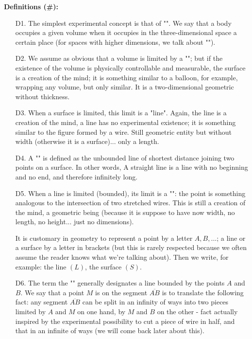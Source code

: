 	\textbf{Definitions (\#\mydef):}
	\begin{enumerate}
		\item[D1.] The simplest experimental concept is that of "". We say that a body occupies a given volume when it occupies in the three-dimensional space a certain place (for spaces with higher dimensions, we talk about "").
		
		\item[D2.] We assume as obvious that a volume is limited by a ""; but if the existence of the volume is physically controllable and measurable, the surface is a creation of the mind; it is something similar to a balloon, for example, wrapping any volume, but only similar. It is a two-dimensional geometric without thickness.
		
		\item[D3.] When a surface is limited, this limit is a "line". Again, the line is a creation of the mind, a line has no experimental existence; it is something similar to the figure formed by a wire. Still geometric entity but without width (otherwise it is a surface)... only a length.
		
		\item[D4.] A "" is defined as the unbounded line of shortest distance joining two points on a surface. In other words, A straight line is a line with no beginning and no end, and therefore infinitely long.
		
		\item[D5.] When a line is limited (bounded), its limit is a "": the point is something analogous to the intersection of two stretched wires. This is still a creation of the mind, a geometric being (because it is suppose to have now width, no length, no height... just no dimensions).


	\begin{tcolorbox}[title=Remark,colframe=black,arc=10pt]
It is customary in geometry to represent a point by a letter $A, B, ...$; a line or a surface by a letter in brackets (but this is rarely respected because we often assume the reader knows what we're talking about). Then we write, for example: the line $(L)$, the surface $(S)$.
	\end{tcolorbox}		
		
		\item[D6.] The term the "" generally designates a line bounded by the points $A$ and $B$. We say that a point $M$ is on the segment $\overline{AB}$ is to translate the following fact: any segment $\overline{AB}$ can be split in an infinity of ways into two pieces limited by $A$ and $M$ on one hand, by $M$ and $B$ on the other - fact actually inspired by the experimental possibility to cut a piece of wire in half, and that in an infinite of ways (we will come back later about this).


\end{enumerate}
